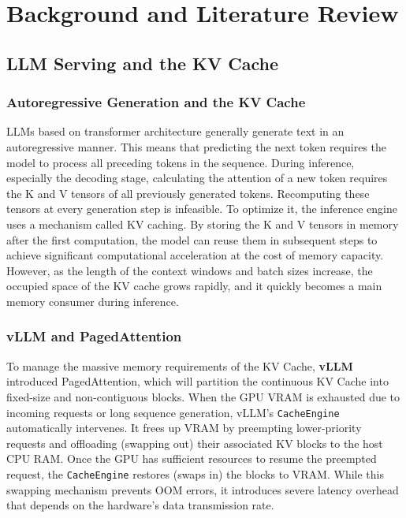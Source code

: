 \documentclass{polyu-comp}
\begin{document}
\section{Background and Literature Review}

\subsection{LLM Serving and the KV Cache}

\subsubsection{Autoregressive Generation and the KV Cache}
LLMs based on transformer architecture generally generate text in an autoregressive manner. This means that predicting the next token requires the model to process all preceding tokens in the sequence. During inference, especially the decoding stage, calculating the attention of a new token requires the K and V tensors of all previously generated tokens. Recomputing these tensors at every generation step is infeasible. To optimize it, the inference engine uses a mechanism called KV caching. By storing the K and V tensors in memory after the first computation, the model can reuse them in subsequent steps to achieve significant computational acceleration at the cost of memory capacity. However, as the length of the context windows and batch sizes increase, the occupied space of the KV cache grows rapidly, and it quickly becomes a main memory consumer during inference.

\subsubsection{vLLM and PagedAttention}
To manage the massive memory requirements of the KV Cache, \textbf{vLLM} introduced PagedAttention, which will partition the continuous KV Cache into fixed-size and non-contiguous blocks. When the GPU VRAM is exhausted due to incoming requests or long sequence generation, vLLM's \texttt{CacheEngine} automatically intervenes. It frees up VRAM by preempting lower-priority requests and offloading (swapping out) their associated KV blocks to the host CPU RAM. Once the GPU has sufficient resources to resume the preempted request, the \texttt{CacheEngine} restores (swaps in) the blocks to VRAM. While this swapping mechanism prevents OOM errors, it introduces severe latency overhead that depends on the hardware's data transmission rate.
\end{document}
